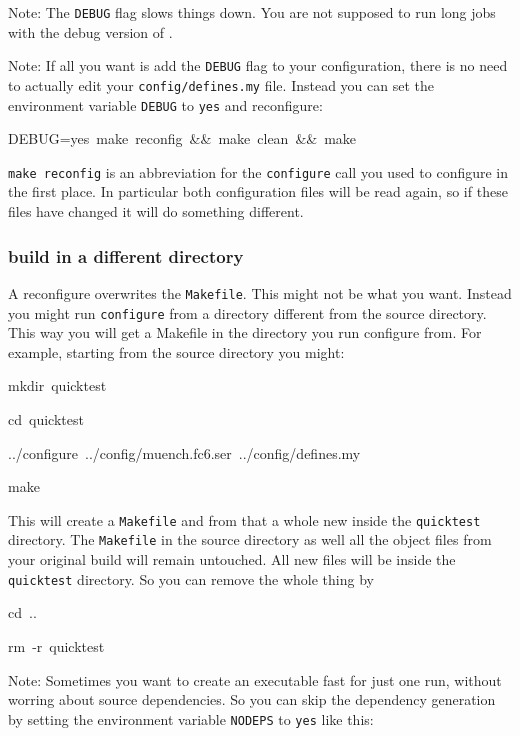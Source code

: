 Note: The \texttt{DEBUG} flag slows things down. You are not supposed
to run long jobs with the debug version of \ccarat{}.

Note: If all you want is add the \texttt{DEBUG} flag to your configuration,
there is no need to actually edit your \texttt{config/defines.my}
file. Instead you can set the environment variable \texttt{DEBUG}
to \texttt{yes} and reconfigure:

\begin{lyxcode}
DEBUG=yes~make~reconfig~\&\&~make~clean~\&\&~make
\end{lyxcode}
\texttt{make reconfig} is an abbreviation for the \texttt{configure}
call you used to configure in the first place. In particular both
configuration files will be read again, so if these files have changed
it will do something different.


\subsubsection{build in a different directory}

A \ccarat{} reconfigure overwrites the \texttt{Makefile}. This might
not be what you want. Instead you might run \texttt{configure} from
a directory different from the \ccarat{} source directory. This way
you will get a Makefile in the directory you run configure from. For
example, starting from the \ccarat{} source directory you might:

\begin{lyxcode}
mkdir~quicktest

cd~quicktest

../configure~../config/muench.fc6.ser~../config/defines.my

make
\end{lyxcode}
This will create a \texttt{Makefile} and from that a whole new \ccarat{}
inside the \texttt{quicktest} directory. The \texttt{Makefile} in
the source directory as well all the object files from your original
build will remain untouched. All new files will be inside the \texttt{quicktest}
directory. So you can remove the whole thing by

\begin{lyxcode}
cd~..

rm~-r~quicktest
\end{lyxcode}
Note: Sometimes you want to create an executable fast for just one
run, without worring about source dependencies. So you can skip the
dependency generation by setting the environment variable \texttt{NODEPS}
to \texttt{yes} like this:

